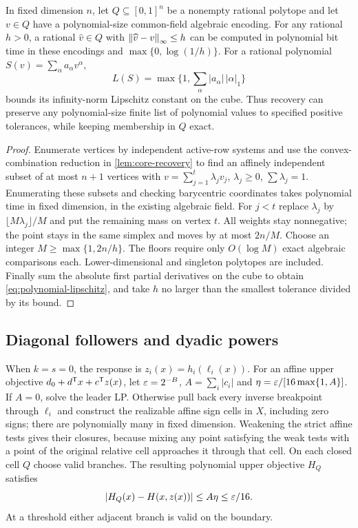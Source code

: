 \begin{lemma}\label{lem:rational-rounding}
In fixed dimension $n$, let $Q\subseteq[0,1]^n$ be a nonempty rational
polytope and let $v\in Q$ have a polynomial-size common-field algebraic
encoding. For any rational $h>0$, a rational $\widehat v\in Q$ with
$\left\lVert\widehat v-v\right\rVert_\infty\le h$ can be computed in polynomial bit
time in these encodings and $\max\{0,\log(1/h)\}$.
For a rational polynomial $S(v)=\sum_\alpha a_\alpha v^\alpha$,
\begin{equation}\label{eq:polynomial-lipschitz}
             L(S)=\max\{1,\sum_\alpha |a_\alpha|\,|\alpha|_1\}
\end{equation}
bounds its infinity-norm Lipschitz constant on the cube. Thus recovery
can preserve any polynomial-size finite list of polynomial values to
specified positive tolerances, while keeping membership in $Q$ exact.
\end{lemma}
\begin{proof}
Enumerate vertices by independent active-row systems and use the
convex-combination reduction in \cref{lem:core-recovery} to find an
affinely independent subset of at most $n+1$ vertices with
$v=\sum_{j=1}^t\lambda_jv_j$, $\lambda_j\ge0$, $\sum\lambda_j=1$.
Enumerating these subsets and checking barycentric coordinates takes
polynomial time in fixed dimension, in the existing algebraic field.
For $j<t$ replace $\lambda_j$ by $\lfloor M\lambda_j\rfloor/M$
and put the remaining mass on vertex $t$. All weights stay nonnegative;
the point stays in the same simplex and moves by at most $2n/M$.
Choose an integer $M\ge\max\{1,2n/h\}$. The floors require only
$O(\log M)$ exact algebraic comparisons each. Lower-dimensional and
singleton polytopes are included. Finally sum the absolute first partial
derivatives on the cube to obtain \eqref{eq:polynomial-lipschitz}, and
take $h$ no larger than the smallest tolerance divided by its bound.
\end{proof}

\subsection{Diagonal followers and dyadic powers}\label{subsec:accuracy-diagonal}

When $k=s=0$, the response is $z_i(x)=h_i(\ell_i(x))$.
For an affine upper objective $d_0+d^{\mathsf T} x+c^{\mathsf T} z(x)$, let
$\varepsilon=2^{-B}$, $A=\sum_i|c_i|$ and
$\eta=\varepsilon/[16\max\{1,A\}]$. If $A=0$, solve the leader LP.
Otherwise pull back every inverse breakpoint through $\ell_i$ and
construct the realizable affine sign cells in $X$, including zero signs;
there are polynomially many in fixed dimension. Weakening the strict affine tests
gives their closures, because mixing any point satisfying the weak tests with a point of the original relative
cell approaches it through that cell. On each closed cell $Q$ choose
valid branches. The resulting polynomial upper objective $H_Q$ satisfies
\begin{equation}\label{eq:diagonal-uniform-error}
                     |H_Q(x)-H(x,z(x))|\le A\eta\le\varepsilon/16.
\end{equation}
At a threshold either adjacent branch is valid on the boundary.

